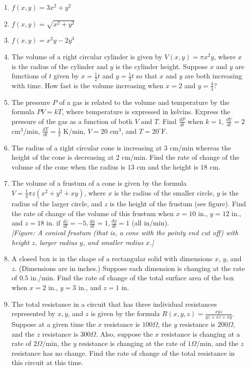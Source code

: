 \documentclass{exercises}
\begin{document}
\begin{enumerate}[resume]
\item $f(x,y)=3x^{2}+y^{2}$
\item $f(x,y)=\sqrt{x^{2}+y^{2}}$
\item $f(x,y)=x^{2}y-2y^{3}$
\item The volume of a right circular cylinder is given by $V(x,y)=\pi x^{2}y$, where $x$ is the radius of the cylinder and $y$ is the cylinder height. Suppose $x$ and $y$ are functions of $t$ given by $x=\frac{1}{2}t$ and $y=\frac{1}{3}t$ so that $x$ and $y$ are both increasing with time. How fast is the volume increasing when $x=2$ and $y=\frac{4}{3}$?
\item The pressure $P$ of a gas is related to the volume and temperature by the formula $PV=kT$, where temperature is expressed in kelvins. Express the pressure of the gas as a function of both $V$ and $T$. Find $\frac{dP}{dt}$ when $k=1$, $\frac{dV}{dt}=2$ cm$^{3}$/min, $\frac{dT}{dt}=\frac{1}{2}$ K/min, $V=20$ cm$^{3}$, and $T=20^\circ \text{F}$.
\item The radius of a right circular cone is increasing at $3$ cm/min whereas the height of the cone is decreasing at $2$ cm/min. Find the rate of change of the volume of the cone when the radius is $13$ cm and the height is $18$ cm.
\item The volume of a frustum of a cone is given by the formula $V=\frac{1}{3}\pi z(x^{2}+y^{2}+xy)$, where $x$ is the radius of the smaller circle, $y$ is the radius of the larger circle, and $z$ is the height of the frustum (see figure). Find the rate of change of the volume of this frustum when $x=10$ in., $y=12$ in., and $z=18$ in. if $\frac{dz}{dt}=-5,\frac{dx}{dt}=1,\frac{dy}{dt}=1$ (all in/min). \\ \textit{[Figure: A conical frustum (that is, a cone with the pointy end cut off) with height $z$, larger radius $y$, and smaller radius $x$.]}
\item A closed box is in the shape of a rectangular solid with dimensions $x$, $y$, and $z$. (Dimensions are in inches.) Suppose each dimension is changing at the rate of $0.5$ in./min. Find the rate of change of the total surface area of the box when $x=2$ in., $y=3$ in., and $z=1$ in.
\item The total resistance in a circuit that has three individual resistances represented by $x,y$, and $z$ is given by the formula $R(x,y,z)=\frac{xyz}{yz+xz+xy}$. Suppose at a given time the $x$ resistance is $100\Omega$, the $y$ resistance is $200\Omega$, and the $z$ resistance is $300\Omega$. Also, suppose the $x$ resistance is changing at a rate of $2\Omega/\text{min}$, the $y$ resistance is changing at the rate of $1\Omega/\text{min}$, and the $z$ resistance has no change. Find the rate of change of the total resistance in this circuit at this time.

\end{enumerate}
\end{document}
